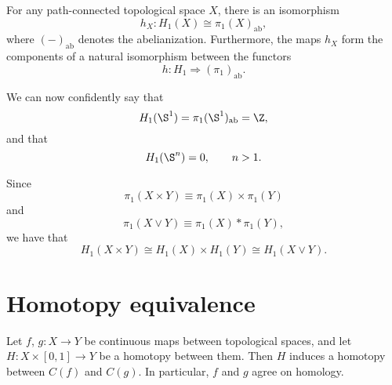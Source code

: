 \documentclass[main.tex]{subfiles}
\begin{document}
\begin{theorem}[Hurewicz]
  \label{thm:hurewicz}
  For any path-connected topological space $X$, there is an isomorphism
  \begin{equation*}
    h_{X}\colon H_{1}(X) \cong \pi_{1}(X)_{\mathrm{ab}},
  \end{equation*}
  where $(-)_{\mathrm{ab}}$ denotes the abelianization. Furthermore, the maps $h_{X}$ form the components of a natural isomorphism between the functors
  \begin{equation*}
    h\colon H_{1} \Rightarrow (\pi_{1})_{\mathrm{ab}}.
  \end{equation*}
\end{theorem}

\begin{example}
  We can now confidently say that
  \begin{equation*}
    H_{1}(\S^{1}) = \pi_{1}(\S^{1})_{\mathrm{ab}} = \Z,
  \end{equation*}
  and that
  \begin{equation*}
    H_{1}(\S^{n}) = 0,\qquad n > 1.
  \end{equation*}
\end{example}

\begin{example}
  Since
  \begin{equation*}
    \pi_{1}(X \times Y) \equiv \pi_{1}(X) \times \pi_{1}(Y)
  \end{equation*}
  and
  \begin{equation*}
    \pi_{1}(X \vee Y) \equiv \pi_{1}(X) * \pi_{1}(Y),
  \end{equation*}
  we have that
  \begin{equation*}
    H_{1}(X \times Y) \cong H_{1}(X) \times H_{1}(Y) \cong H_{1}(X \vee Y).
  \end{equation*}
\end{example}

\section{Homotopy equivalence}
\label{sec:homotopy_equivalence}

\begin{proposition}
  Let $f$, $g\colon X \to Y$ be continuous maps between topological spaces, and let $H\colon X \times [0, 1] \to Y$ be a homotopy between them. Then $H$ induces a homotopy between $C(f)$ and $C(g)$. In particular, $f$ and $g$ agree on homology.
\end{proposition}
\end{document}
